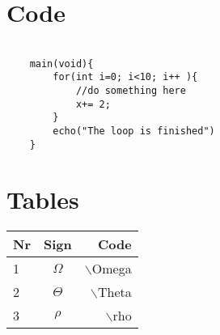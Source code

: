 \documentclass[a4paper]{article}
\begin{document}
\begin{multicols}{3}
    \columnbreak 

    \section{Code}
    \begin{lstlisting}
    
    main(void){
        for(int i=0; i<10; i++ ){
            //do something here 
            x+= 2;
        }
        echo("The loop is finished")
    }
    \end{lstlisting}


    \section{Tables}
    \begin{tabular}{l|c|r}
        Nr & Sign & Code \\\hline
        1 & $\Omega$ & $\backslash$Omega \\
        2 & $\Theta$ & $\backslash$Theta \\
        3 & $\rho$ & $\backslash$rho 
    \end{tabular}

\end{multicols}
\end{document}
